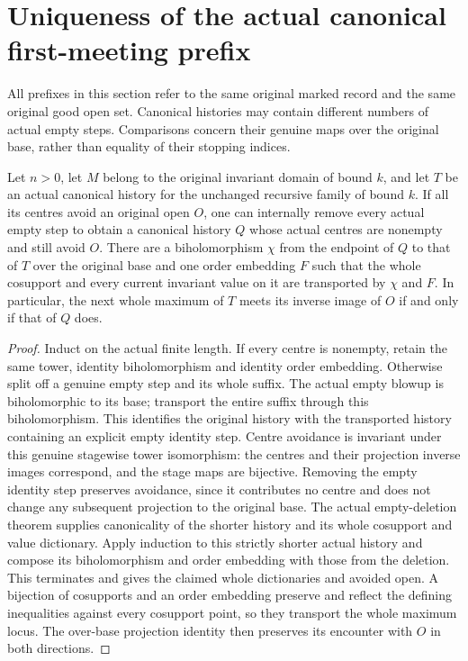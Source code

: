 \section{Uniqueness of the actual canonical first-meeting prefix}

All prefixes in this section refer to the same original marked record and
the same original good open set.  Canonical histories may contain different
numbers of actual empty steps.  Comparisons concern their genuine maps over
the original base, rather than equality of their stopping indices.

\begin{theorem}
\label{hir:original-empty-compression-preserves-first-open}
\leanok
{}
Let $n>0$, let $M$ belong to the original invariant domain of bound $k$,
and let $T$ be an actual canonical history for the unchanged recursive
family of bound $k$.  If all its centres avoid an original open $O$, one
can internally remove every actual empty step to obtain a canonical
history $Q$ whose actual centres are nonempty and still avoid $O$.
There are a biholomorphism $\chi$ from the endpoint of $Q$ to that of $T$
over the original base and one order embedding $F$ such that the whole
cosupport and every current invariant value on it are transported by
$\chi$ and $F$.  In particular, the next whole maximum of $T$ meets its
inverse image of $O$ if and only if that of $Q$ does.
\end{theorem}
\begin{proof}
Induct on the actual finite length.  If every centre is nonempty, retain
the same tower, identity biholomorphism and identity order embedding.
Otherwise split off a genuine empty step and its whole suffix.  The
actual empty blowup is biholomorphic to its base; transport the entire
suffix through this biholomorphism.  This identifies the original
history with the transported history containing an explicit empty
identity step.  Centre avoidance is invariant under this genuine
stagewise tower isomorphism: the centres and their projection inverse
images correspond, and the stage maps are bijective.  Removing the
empty identity step preserves avoidance, since it contributes no centre
and does not change any subsequent projection to the original base.
The actual empty-deletion theorem supplies canonicality of the shorter
history and its whole cosupport and value dictionary.  Apply induction
to this strictly shorter actual history and compose its biholomorphism
and order embedding with those from the deletion.  This terminates and
gives the claimed whole dictionaries and avoided open.  A bijection of
cosupports and an order embedding preserve and reflect the defining
inequalities against every cosupport point, so they transport the whole
maximum locus.  The over-base projection identity then preserves its
encounter with $O$ in both directions.
\end{proof}

